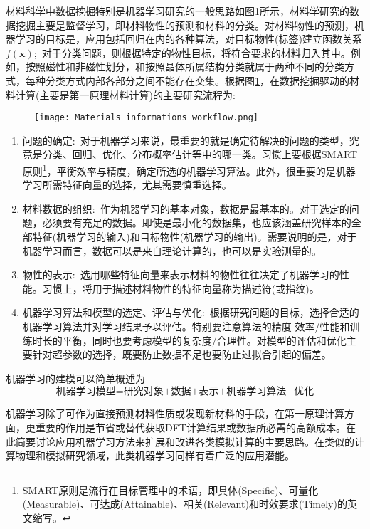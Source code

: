 材料科学中数据挖掘特别是机器学习研究的一般思路如图\ref{npjCM}所示，材料学研究的数据挖掘主要是监督学习，即材料物性的预测和材料的分类。对材料物性的预测，机器学习的目标是，应用包括回归在内的各种算法，对目标物性(标签)建立函数关系$f(\mathbf{x})$;~对于分类问题，则根据特定的物性目标，将符合要求的材料归入其中。例如，按照磁性和非磁性划分，和按照晶体所属结构分类就属于两种不同的分类方式，每种分类方式内部各部分之间不能存在交集。根据图\ref{npjCM}，在数据挖掘驱动的材料计算(主要是第一原理材料计算)的主要研究流程为:
\begin{figure}[h!]
\centering
\vspace*{-0.1in}
\texttt{[image: Materials\_informations\_workflow.png]}
\caption{\fontsize{7.2pt}{4.2pt}}%
\label{npjCM}
\end{figure}
\begin{enumerate}
	\item 问题的确定:~对于机器学习来说，最重要的就是确定待解决的问题的类型，究竟是分类、回归、优化、分布概率估计等中的哪一类。习惯上要根据\textrm{SMART}原则\footnote{\textrm{SMART}原则是流行在目标管理中的术语，即具体\textrm{(Specific)}、可量化\textrm{(Measurable)}、可达成\textrm{(Attainable)}、相关\textrm{(Relevant)}和时效要求\textrm{(Timely)}的英文缩写。}，平衡效率与精度，确定所选的机器学习算法。此外，很重要的是机器学习所需特征向量的选择，尤其需要慎重选择。
	\item 材料数据的组织:~作为机器学习的基本对象，数据是最基本的。对于选定的问题，必须要有充足的数据。即使是最小化的数据集，也应该涵盖研究样本的全部特征(机器学习的输入)和目标物性(机器学习的输出)。需要说明的是，对于机器学习而言，数据可以是来自理论计算的，也可以是实验测量的。
	\item 物性的表示:~选用哪些特征向量来表示材料的物性往往决定了机器学习的性能。习惯上，将用于描述材料物性的特征向量称为描述符\cite{PRL114-105503_2015}(或指纹)。
	\item 机器学习算法和模型的选定、评估与优化:~根据研究问题的目标，选择合适的机器学习算法并对学习结果予以评估。特别要注意算法的精度-效率/性能和训练时长的平衡，同时也要考虑模型的复杂度/合理性。对模型的评估和优化主要针对超参数的选择，既要防止数据不足也要防止过拟合引起的偏差。
\end{enumerate}
机器学习的建模可以简单概述为
\begin{displaymath}
	\mbox{机器学习模型=研究对象+数据+表示+机器学习算法+优化}
\end{displaymath}

机器学习除了可作为直接预测材料性质或发现新材料的手段，在第一原理计算方面，更重要的作用是节省或替代获取\textrm{DFT}计算结果或数据所必需的高额成本。在此简要讨论应用机器学习方法来扩展和改进各类模拟计算的主要思路。在类似的计算物理和模拟研究领域，此类机器学习同样有着广泛的应用潜能。

